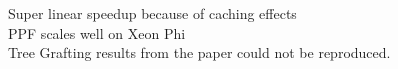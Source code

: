 \documentclass[letterpaper]{article}
\newcommand{\mypar}[1]{{\bf #1.}}
\begin{document}
Super linear speedup because of caching effects\\
PPF scales well on Xeon Phi\\
Tree Grafting results from the paper could not be reproduced.
%
%
%
%
%
%
%
%
%
%
%
%
%
%
%
%
\end{document}
